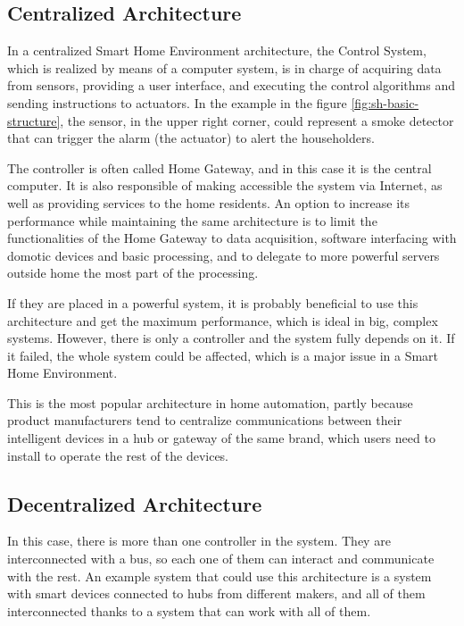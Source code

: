 \subsection{Centralized Architecture}
In a centralized Smart Home Environment architecture, the Control System, which is realized by means of a computer
system, is in charge of acquiring data from sensors, providing a user interface, and executing the control algorithms and 
sending instructions to actuators.\cite{badica13} In the example in the figure \ref{fig:sh-basic-structure}, the sensor, in the
upper right corner, could represent a smoke detector that can trigger the alarm (the actuator) to alert the householders.

The controller is often called Home Gateway, and in this case it is the central computer. It is also responsible of making 
accessible the system via Internet, as well as providing services to the home residents. An option to increase its performance 
while maintaining the same architecture is to limit the functionalities of the Home Gateway to data acquisition, software 
interfacing with domotic devices and basic processing, and to delegate to more powerful servers outside home the most
part of the processing.

If they are placed in a powerful system, it is probably beneficial to use this architecture and get the maximum performance,
which is ideal in big, complex systems.\cite{raulCarreteroElegir} However, there is only a controller and the system fully depends
on it. If it failed, the whole system could be affected, which is a major issue in a Smart Home Environment.

This is the most popular architecture in home automation, partly because product manufacturers tend to centralize communications
between their intelligent devices in a hub or gateway of the same brand, which users need to install to operate the rest of the devices.

\subsection{Decentralized Architecture}
In this case, there is more than one controller in the system. They are interconnected with a bus, so each one of them can interact
and communicate with the rest. An example system that could use this architecture is a system with smart devices connected to 
hubs from different makers, and all of them interconnected thanks to a system that can work with all of them.

